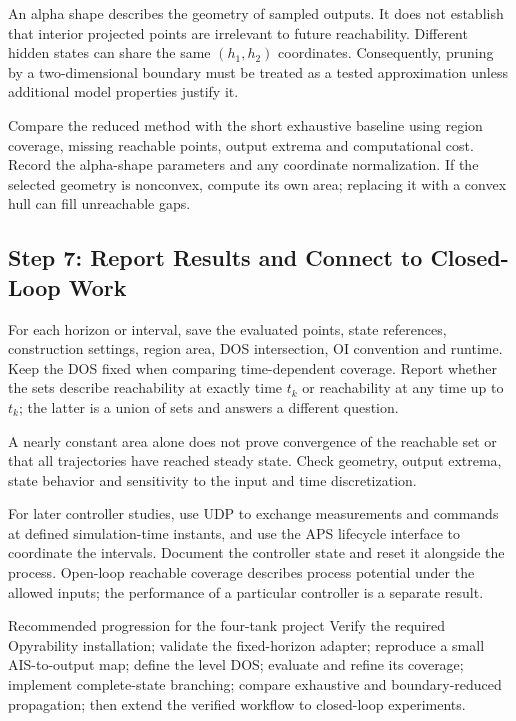 \documentclass[11pt, letterpaper]{article}
\begin{document}
An alpha shape describes the geometry of sampled outputs. It does not establish that interior projected points are irrelevant to future reachability. Different hidden states can share the same $(h_1,h_2)$ coordinates. Consequently, pruning by a two-dimensional boundary must be treated as a tested approximation unless additional model properties justify it.

Compare the reduced method with the short exhaustive baseline using region coverage, missing reachable points, output extrema and computational cost. Record the alpha-shape parameters and any coordinate normalization. If the selected geometry is nonconvex, compute its own area; replacing it with a convex hull can fill unreachable gaps.

\subsection{Step 7: Report Results and Connect to Closed-Loop Work}
For each horizon or interval, save the evaluated points, state references, construction settings, region area, DOS intersection, OI convention and runtime. Keep the DOS fixed when comparing time-dependent coverage. Report whether the sets describe reachability at exactly time $t_k$ or reachability at any time up to $t_k$; the latter is a union of sets and answers a different question.

A nearly constant area alone does not prove convergence of the reachable set or that all trajectories have reached steady state. Check geometry, output extrema, state behavior and sensitivity to the input and time discretization.

For later controller studies, use UDP to exchange measurements and commands at defined simulation-time instants, and use the APS lifecycle interface to coordinate the intervals. Document the controller state and reset it alongside the process. Open-loop reachable coverage describes process potential under the allowed inputs; the performance of a particular controller is a separate result.

\begin{stepbox}{Recommended progression for the four-tank project}
Verify the required Opyrability installation; validate the fixed-horizon adapter; reproduce a small AIS-to-output map; define the level DOS; evaluate and refine its coverage; implement complete-state branching; compare exhaustive and boundary-reduced propagation; then extend the verified workflow to closed-loop experiments.
\end{stepbox}
\end{document}
